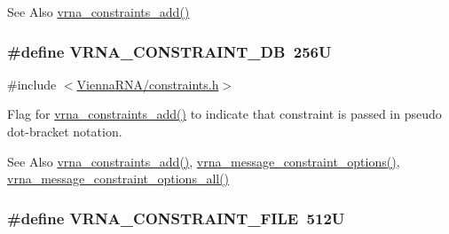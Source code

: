 \begin{DoxySeeAlso}{See Also}
\hyperlink{group__constraints_ga35a401f680969a556858a8dd5f1d07cc}{vrna\-\_\-constraints\-\_\-add()} 
\end{DoxySeeAlso}
\hypertarget{group__constraints_ga4bfc2f15c4f261c62a11af9d2aa80c90}{
\subsubsection[{V\-R\-N\-A\-\_\-\-C\-O\-N\-S\-T\-R\-A\-I\-N\-T\-\_\-\-D\-B}]{\setlength{\rightskip}{0pt plus 5cm}\#define V\-R\-N\-A\-\_\-\-C\-O\-N\-S\-T\-R\-A\-I\-N\-T\-\_\-\-D\-B~256\-U}}\label{group__constraints_ga4bfc2f15c4f261c62a11af9d2aa80c90}


{\ttfamily \#include $<$\hyperlink{constraints_8h}{Vienna\-R\-N\-A/constraints.\-h}$>$}



Flag for \hyperlink{group__constraints_ga35a401f680969a556858a8dd5f1d07cc}{vrna\-\_\-constraints\-\_\-add()} to indicate that constraint is passed in pseudo dot-\/bracket notation. 

\begin{DoxySeeAlso}{See Also}
\hyperlink{group__constraints_ga35a401f680969a556858a8dd5f1d07cc}{vrna\-\_\-constraints\-\_\-add()}, \hyperlink{group__constraints_gaa1f20b53bf09ac2e6b0dbb13f7d89670}{vrna\-\_\-message\-\_\-constraint\-\_\-options()}, \hyperlink{group__constraints_gaec7e13fa0465c2acc7a621d1aecb709f}{vrna\-\_\-message\-\_\-constraint\-\_\-options\-\_\-all()} 
\end{DoxySeeAlso}
\hypertarget{group__constraints_ga62e0ed0c33002c09423de4e646f85a2b}{
\subsubsection[{V\-R\-N\-A\-\_\-\-C\-O\-N\-S\-T\-R\-A\-I\-N\-T\-\_\-\-F\-I\-L\-E}]{\setlength{\rightskip}{0pt plus 5cm}\#define V\-R\-N\-A\-\_\-\-C\-O\-N\-S\-T\-R\-A\-I\-N\-T\-\_\-\-F\-I\-L\-E~512\-U}}\label{group__constraints_ga62e0ed0c33002c09423de4e646f85a2b}


